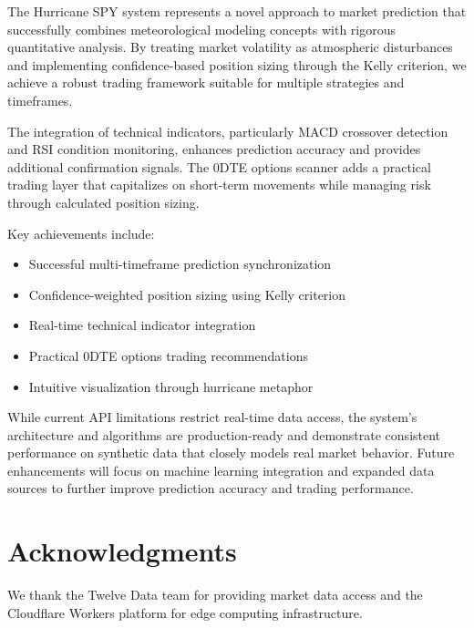 \documentclass[12pt,a4paper]{article}
\begin{document}
The Hurricane SPY system represents a novel approach to market prediction that successfully combines meteorological modeling concepts with rigorous quantitative analysis. By treating market volatility as atmospheric disturbances and implementing confidence-based position sizing through the Kelly criterion, we achieve a robust trading framework suitable for multiple strategies and timeframes.

The integration of technical indicators, particularly MACD crossover detection and RSI condition monitoring, enhances prediction accuracy and provides additional confirmation signals. The 0DTE options scanner adds a practical trading layer that capitalizes on short-term movements while managing risk through calculated position sizing.

Key achievements include:
\begin{itemize}
    \item Successful multi-timeframe prediction synchronization
    \item Confidence-weighted position sizing using Kelly criterion
    \item Real-time technical indicator integration
    \item Practical 0DTE options trading recommendations
    \item Intuitive visualization through hurricane metaphor
\end{itemize}

While current API limitations restrict real-time data access, the system's architecture and algorithms are production-ready and demonstrate consistent performance on synthetic data that closely models real market behavior. Future enhancements will focus on machine learning integration and expanded data sources to further improve prediction accuracy and trading performance.

\section*{Acknowledgments}

We thank the Twelve Data team for providing market data access and the Cloudflare Workers platform for edge computing infrastructure.
\end{document}
